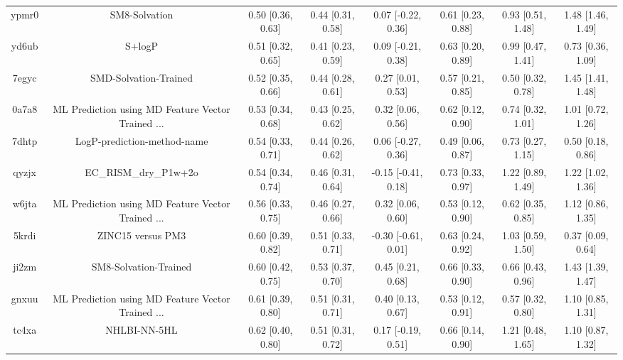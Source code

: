 \documentclass{article}
\begin{document}
\begin{center}
\begin{longtable}{|cccccccc|}
 ypmr0 &                                      SM8-Solvation &  0.50 [0.36, 0.63] &  0.44 [0.31, 0.58] &    0.07 [-0.22, 0.36] &  0.61 [0.23, 0.88] &    0.93 [0.51, 1.48] &     1.48 [1.46, 1.49] \\
 yd6ub &                                             S+logP &  0.51 [0.32, 0.65] &  0.41 [0.23, 0.59] &    0.09 [-0.21, 0.38] &  0.63 [0.20, 0.89] &    0.99 [0.47, 1.41] &     0.73 [0.36, 1.09] \\
 7egyc &                              SMD-Solvation-Trained &  0.52 [0.35, 0.66] &  0.44 [0.28, 0.61] &     0.27 [0.01, 0.53] &  0.57 [0.21, 0.85] &    0.50 [0.32, 0.78] &     1.45 [1.41, 1.48] \\
 0a7a8 &  ML Prediction using MD Feature Vector Trained ... &  0.53 [0.34, 0.68] &  0.43 [0.25, 0.62] &     0.32 [0.06, 0.56] &  0.62 [0.12, 0.90] &    0.74 [0.32, 1.01] &     1.01 [0.72, 1.26] \\
 7dhtp &                        LogP-prediction-method-name &  0.54 [0.33, 0.71] &  0.44 [0.26, 0.62] &    0.06 [-0.27, 0.36] &  0.49 [0.06, 0.87] &    0.73 [0.27, 1.15] &     0.50 [0.18, 0.86] \\
 qyzjx &                              EC\_RISM\_dry\_P1w+2o &  0.54 [0.34, 0.74] &  0.46 [0.31, 0.64] &   -0.15 [-0.41, 0.18] &  0.73 [0.33, 0.97] &    1.22 [0.89, 1.49] &     1.22 [1.02, 1.36] \\
 w6jta &  ML Prediction using MD Feature Vector Trained ... &  0.56 [0.33, 0.75] &  0.46 [0.27, 0.66] &     0.32 [0.06, 0.60] &  0.53 [0.12, 0.90] &    0.62 [0.35, 0.85] &     1.12 [0.86, 1.35] \\
 5krdi &                                  ZINC15 versus PM3 &  0.60 [0.39, 0.82] &  0.51 [0.33, 0.71] &   -0.30 [-0.61, 0.01] &  0.63 [0.24, 0.92] &    1.03 [0.59, 1.50] &     0.37 [0.09, 0.64] \\
 ji2zm &                              SM8-Solvation-Trained &  0.60 [0.42, 0.75] &  0.53 [0.37, 0.70] &     0.45 [0.21, 0.68] &  0.66 [0.33, 0.90] &    0.66 [0.43, 0.96] &     1.43 [1.39, 1.47] \\
 gnxuu &  ML Prediction using MD Feature Vector Trained ... &  0.61 [0.39, 0.80] &  0.51 [0.31, 0.71] &     0.40 [0.13, 0.67] &  0.53 [0.12, 0.91] &    0.57 [0.32, 0.80] &     1.10 [0.85, 1.31] \\
 tc4xa &                                       NHLBI-NN-5HL &  0.62 [0.40, 0.80] &  0.51 [0.31, 0.72] &    0.17 [-0.19, 0.51] &  0.66 [0.14, 0.90] &    1.21 [0.48, 1.65] &     1.10 [0.87, 1.32] \\

\end{longtable}
\end{center}
\end{document}
